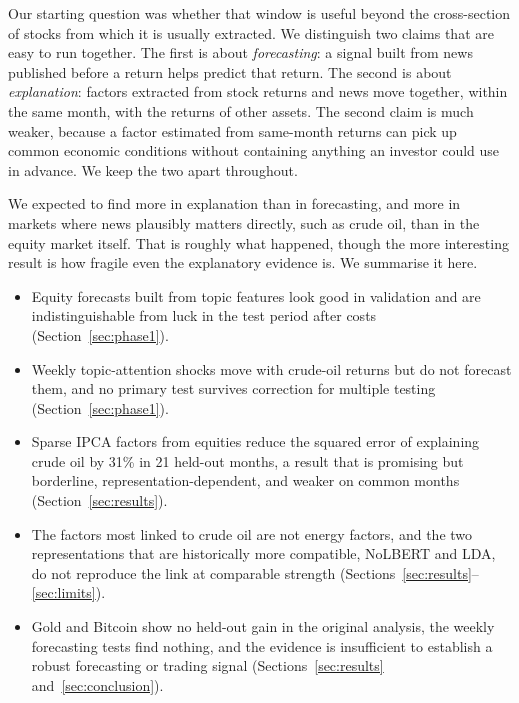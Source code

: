 \documentclass[11pt]{article}
\begin{document}
Our starting question was whether that window is useful beyond the cross-section of stocks from which it is usually extracted. We distinguish two claims that are easy to run together. The first is about \emph{forecasting}: a signal built from news published before a return helps predict that return. The second is about \emph{explanation}: factors extracted from stock returns and news move together, within the same month, with the returns of other assets. The second claim is much weaker, because a factor estimated from same-month returns can pick up common economic conditions without containing anything an investor could use in advance. We keep the two apart throughout.

We expected to find more in explanation than in forecasting, and more in markets where news plausibly matters directly, such as crude oil, than in the equity market itself. That is roughly what happened, though the more interesting result is how fragile even the explanatory evidence is. We summarise it here.

\begin{itemize}
\item Equity forecasts built from topic features look good in validation and are indistinguishable from luck in the test period after costs (Section~\ref{sec:phase1}).
\item Weekly topic-attention shocks move with crude-oil returns but do not forecast them, and no primary test survives correction for multiple testing (Section~\ref{sec:phase1}).
\item Sparse IPCA factors from equities reduce the squared error of explaining crude oil by 31\% in 21 held-out months, a result that is promising but borderline, representation-dependent, and weaker on common months (Section~\ref{sec:results}).
\item The factors most linked to crude oil are not energy factors, and the two representations that are historically more compatible, NoLBERT and LDA, do not reproduce the link at comparable strength (Sections~\ref{sec:results}--\ref{sec:limits}).
\item Gold and Bitcoin show no held-out gain in the original analysis, the weekly forecasting tests find nothing, and the evidence is insufficient to establish a robust forecasting or trading signal (Sections~\ref{sec:results} and~\ref{sec:conclusion}).
\end{itemize}
\end{document}
